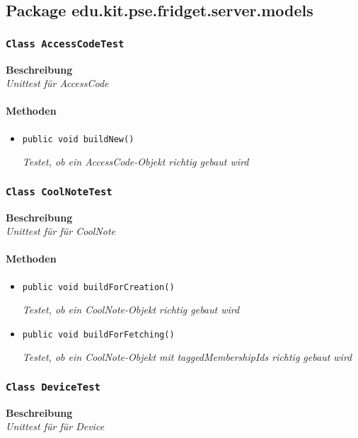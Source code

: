 

 \subsection{Package edu.kit.pse.fridget.server.models}
 \subsubsection{\texttt{Class AccessCodeTest}}
 \textbf{Beschreibung} \\
 \textit{Unittest für AccessCode}
 \paragraph*{Methoden}
 \begin{itemize}
    	\item{\texttt{public void buildNew()}}
    	
    	\textit{Testet, ob ein AccessCode-Objekt richtig gebaut wird}
 \end{itemize}

 \subsubsection{\texttt{Class CoolNoteTest}}
 \textbf{Beschreibung} \\
 \textit{Unittest für für CoolNote}
 \paragraph*{Methoden}
 \begin{itemize}
    	\item{\texttt{public void buildForCreation()}}
    	
    	\textit{Testet, ob ein CoolNote-Objekt richtig gebaut wird}
    	
    	\item{\texttt{public void buildForFetching()}}
    	
    	\textit{Testet, ob ein CoolNote-Objekt mit taggedMembershipIds richtig gebaut wird}
 \end{itemize}

 \subsubsection{\texttt{Class DeviceTest}}
 \textbf{Beschreibung} \\
 \textit{Unittest für für Device}
